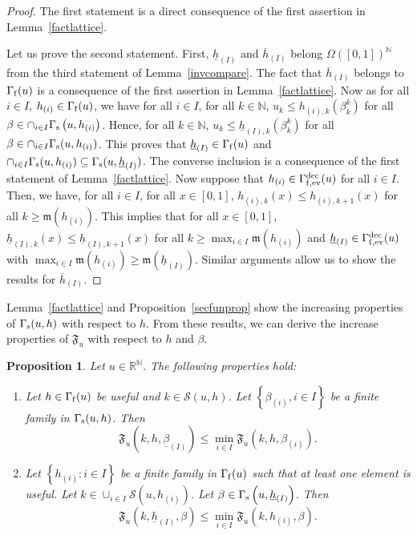 \documentclass{article}
\def\funset{\Gamma}
\def\fmonfung{{\funset}_{\rm f,{\rm ev}}^{\rm dec}}
\def\fset{\Omega([0,1])}
\def\mon{\mathfrak{m}}
\def\secfunh{\funset_{\rm f}}
\def\secfunb{\funset_{\rm s}}
\def\Fu{\mathfrak{F}_u}
\def\rr{\mathbb R}
\def\nn{\mathbb N}
\def\res{\mathcal{S}}
\newtheorem{prop}{Proposition}
\def\red#1{#1}
\def\blue#1{#1}
\begin{document}
	\begin{proof}
		The first statement is a direct consequence of the first assertion in Lemma~\ref{factlattice}.
		
		Let us prove the second statement. First, $\underline{h}_{(I)}$ and $\overline{h}_{(I)}$ belong $\fset^\nn$ from the third statement of Lemma~\ref{invcompare}. The fact that $\overline{h}_{(I)}$ belongs to $\secfunh(u)$ is a consequence of the first assertion in Lemma~\ref{factlattice}. Now as for all $i\in I$, $h_{(i)}\in\secfunh(u)$, we have for all $i\in I$, for all $k\in\nn$, $u_k\leq h_{(i),k}(\beta_{k}^k)$ for all $\beta\in \cap_{i\in I} \secfunb\left(u,h_{(i)}\right)$. Hence, for all $k\in\nn$, $u_k\leq \underline{h}_{(I),k}(\beta_{k}^k)$ for all $\beta\in \cap_{i\in I} \secfunb(u,h_{(i)})$. This proves that $\underline{h}_{(I)}\in \secfunh(u)$ and $\cap_{i\in I} \secfunb(u,h_{(i)})  \subseteq \secfunb(u,\underline{h}_{(I)})$. The converse inclusion is a consequence of the first statement of Lemma~\ref{factlattice}. Now suppose that $h_{(i)}\in\fmonfung(u)$ for all $i\in I$. Then, we have, for all $i\in I$, for all $x\in [0,1]$, $h_{(i),k}(x)\leq h_{(i),k+1}(x)$ for all $k\geq \mon(h_{(i)})$. This implies that for all $x\in [0,1]$, $\underline{h}_{(I),k}(x)\leq \underline{h}_{(I),k+1}(x)$ for all $k\geq \max_{i\in I} \mon(h_{(i)})$ and $\underline{h}_{(I)}\in\fmonfung(u)$ with $\max_{i\in I} \mon(h_{(i)})\geq \mon(\underline{h}_{(I)})$. \blue{Similar arguments allow us to show the results for $\overline{h}_{(I)}$.}
	\end{proof}
	Lemma~\ref{factlattice} and Proposition~\ref{secfunprop} show the \red{increasing} properties of $\secfunb(u,h)$ with respect to $h$. From \red{these} results, we can derive \red{the} increase properties of $\Fu$ with respect to $h$ and $\beta$.  
	\begin{prop}
		\label{simplefactFu}
		Let $u\in\rr^\nn$. The following properties hold:
		\begin{enumerate}
			\item Let $h\in\secfunh(u)$ be useful and $k\in\res(u,h)$. Let $\left\{\beta_{(i)},i\in I\right\}$ be a finite family in $\secfunb(u,h)$. Then \[\Fu\left(k,h,\underline{\beta}_{(I)}\right)\leq \min_{i\in I}\Fu\left(k,h,\beta_{(i)}\right).\]
			\item Let $\left\{h_{(i)}: i\in I\right\}$ be a finite family in $\secfunh(u)$ such that at least one element is useful. Let $k\in \cup_{i\in I}\res\left(u,h_{(i)}\right)$. Let $\beta\in\secfunb\left(u,\underline{h}_{(I)}\right)$. Then 
			\[
			\Fu\left(k,\underline{h}_{(I)},\beta\right)\leq \min_{i\in I} \Fu\left(k,h_{(i)},\beta\right) .
			\]
		\end{enumerate}
	\end{prop}
	
\end{document}
